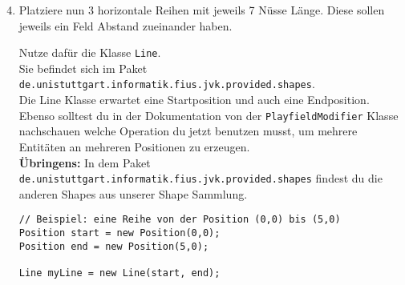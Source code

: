 \begin{enumerate} \setcounter{enumi}{3}
    \item Platziere nun 3 horizontale Reihen mit jeweils 7 Nüsse Länge.
    Diese sollen jeweils ein Feld Abstand zueinander haben.
    
    Nutze dafür die Klasse \lstinline{Line}.\\
    Sie befindet sich im Paket \texttt{de.unistuttgart.informatik.fius.jvk.provided.shapes}.\\
    
    Die Line Klasse erwartet eine Startposition und auch eine Endposition.\\
    Ebenso solltest du in der Dokumentation von der \lstinline{PlayfieldModifier} Klasse nachschauen welche Operation du jetzt benutzen musst, um mehrere Entitäten an mehreren Positionen zu erzeugen.\\
    
    \textbf{Übringens:} In dem Paket \texttt{de.unistuttgart.informatik.fius.jvk.provided.shapes} findest du die anderen Shapes aus unserer Shape Sammlung.

    \begin{lstlisting}
// Beispiel: eine Reihe von der Position (0,0) bis (5,0)
Position start = new Position(0,0);
Position end = new Position(5,0);

Line myLine = new Line(start, end);
    \end{lstlisting}

\end{enumerate}

\newpage
